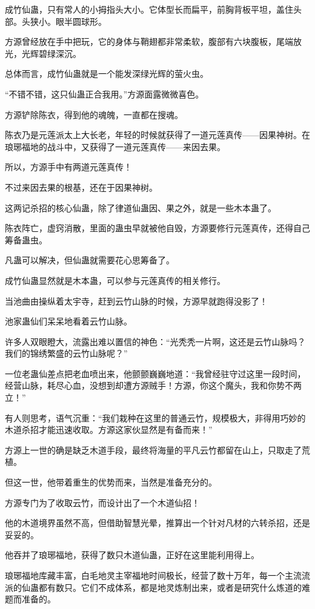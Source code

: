 \begin{this_body}
成竹仙蛊，只有常人的小拇指头大小。它体型长而扁平，前胸背板平坦，盖住头部。头狭小。眼半圆球形。

方源曾经放在手中把玩，它的身体与鞘翅都非常柔软，腹部有六块腹板，尾端放光，光辉碧绿深沉。

总体而言，成竹仙蛊就是一个能发深绿光辉的萤火虫。

“不错不错，这只仙蛊正合我用。”方源面露微微喜色。

方源铲除陈衣，得到他的魂魄，一直都在搜魂。

陈衣乃是元莲派太上大长老，年轻的时候就获得了一道元莲真传——因果神树。在琅琊福地的战斗中，又获得了一道元莲真传——来因去果。

所以，方源手中有两道元莲真传！

不过来因去果的根基，还在于因果神树。

这两记杀招的核心仙蛊，除了律道仙蛊因、果之外，就是一些木本蛊了。

陈衣阵亡，虚窍消散，里面的蛊虫早就被他自毁，方源要修行元莲真传，还得自己筹备蛊虫。

凡蛊可以解决，但仙蛊就需要花心思筹备了。

成竹仙蛊显然就是木本蛊，可以参与元莲真传的相关修行。

当池曲由操纵着太宇寺，赶到云竹山脉的时候，方源早就跑得没影了！

池家蛊仙们呆呆地看着云竹山脉。

许多人双眼瞪大，流露出难以置信的神色：“光秃秃一片啊，这还是云竹山脉吗？我们的锦绣繁盛的云竹山脉呢？”

一位老蛊仙差点把老血喷出来，他颤颤巍巍地道：“我曾经驻守过这里一段时间，经营山脉，耗尽心血，没想到却遭方源贼手！方源，你这个魔头，我和你势不两立！”

有人则思考，语气沉重：“我们栽种在这里的普通云竹，规模极大，非得用巧妙的木道杀招才能迅速收取。方源这家伙显然是有备而来！”

方源上一世的确是缺乏木道手段，最终将海量的平凡云竹都留在山上，只取走了荒植。

但这一世，他带着重生的优势而来，当然是准备充分的。

方源专门为了收取云竹，而设计出了一个木道仙招！

他的木道境界虽然不高，但借助智慧光晕，推算出一个针对凡材的六转杀招，还是妥妥的。

他吞并了琅琊福地，获得了数只木道仙蛊，正好在这里能利用得上。

琅琊福地库藏丰富，白毛地灵主宰福地时间极长，经营了数十万年，每一个主流流派的仙蛊都有数只。它们不成体系，都是地灵炼制出来，或者是研究什么炼道的难题而准备的。


\end{this_body}
